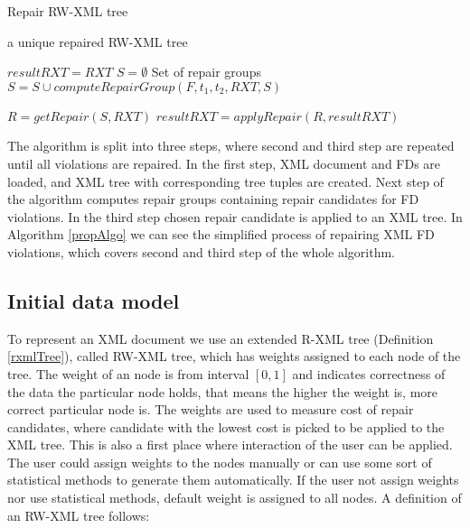 \begin{algorithm}
\caption{Repair RW-XML tree}
\label{propAlgo}
\begin{algorithmic}[1]
\ENSURE a unique repaired RW-XML tree

\STATE $resultRXT = RXT$
    \STATE $S = \emptyset$ \COMMENT Set of repair groups
		    \STATE $S = S \cup computeRepairGroup(F, t_1, t_2, RXT, S)$
	    \ENDFOR
    \ENDFOR

    \STATE $R = getRepair(S, RXT)$
    \STATE $resultRXT = applyRepair(R, resultRXT)$
\ENDWHILE

\end{algorithmic}
\end{algorithm}

The algorithm is split into three steps, where second and third step are repeated until all violations are repaired. In the first step, XML document and FDs are loaded, and XML tree with corresponding tree tuples are created. Next step of the algorithm computes repair groups containing repair candidates for FD violations. In the third step chosen repair candidate is applied to an XML tree. In Algorithm \ref{propAlgo} we can see the simplified process of repairing XML FD violations, which covers second and third step of the whole algorithm.

\subsection{Initial data model}

To represent an XML document we use an extended R-XML tree (Definition \ref{rxmlTree}), called RW-XML tree, which has weights assigned to each node of the tree. The weight of an node is from interval $[0,1]$ and indicates correctness of the data the particular node holds, that means the higher the weight is, more correct particular node is. The weights are used to measure cost of repair candidates, where candidate with the lowest cost is picked to be applied to the XML tree. This is also a first place where interaction of the user can be applied. The user could assign weights to the nodes manually or can use some sort of statistical methods to generate them automatically. If the user not assign weights nor use statistical methods, default weight is assigned to all nodes. A definition of an RW-XML tree follows:

